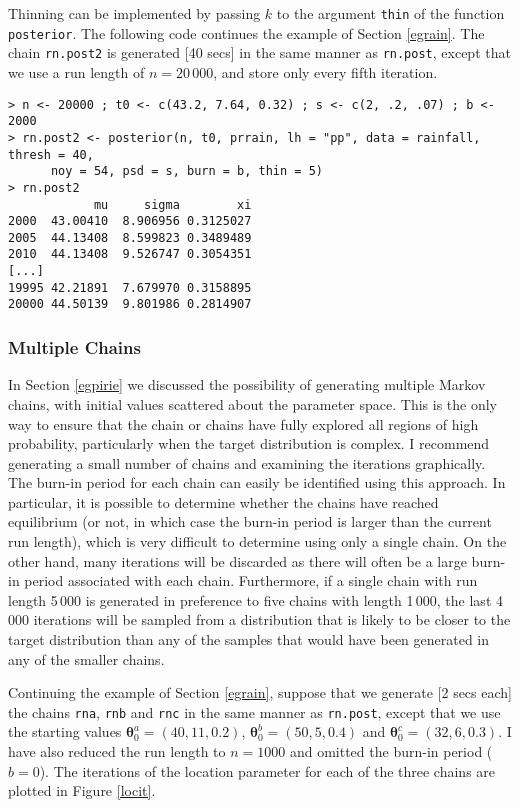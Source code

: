 \documentclass[11pt,a4paper]{article}
\newcommand{\bs}{\boldsymbol}
\begin{document}
Thinning can be implemented by passing $k$ to the argument \verb+thin+
of the function \verb+posterior+.  The following code continues the
example of Section \ref{egrain}.  The chain \verb+rn.post2+ is
generated [40 secs] in the same manner as \verb+rn.post+, except that
we use a run length of $n=20\,000$, and store only every fifth
iteration.

\begin{verbatim}
> n <- 20000 ; t0 <- c(43.2, 7.64, 0.32) ; s <- c(2, .2, .07) ; b <- 2000
> rn.post2 <- posterior(n, t0, prrain, lh = "pp", data = rainfall, thresh = 40, 
      noy = 54, psd = s, burn = b, thin = 5)
> rn.post2
            mu     sigma        xi
2000  43.00410  8.906956 0.3125027
2005  44.13408  8.599823 0.3489489
2010  44.13408  9.526747 0.3054351
[...]
19995 42.21891  7.679970 0.3158895
20000 44.50139  9.801986 0.2814907
\end{verbatim}

\subsubsection{Multiple Chains}
\label{multiple}

In Section \ref{egpirie} we discussed the possibility of generating
multiple Markov chains, with initial values scattered about the
parameter space.  This is the only way to ensure that the chain or
chains have fully explored all regions of high probability,
particularly when the target distribution is complex.  I recommend
generating a small number of chains and examining the iterations
graphically.  The burn-in period for each chain can easily be
identified using this approach.  In particular, it is possible to
determine whether the chains have reached equilibrium (or not, in
which case the burn-in period is larger than the current run length),
which is very difficult to determine using only a single chain.  On
the other hand, many iterations will be discarded as there will often
be a large burn-in period associated with each chain.  Furthermore, if
a single chain with run length 5\,000 is generated in preference to
five chains with length 1\,000, the last 4\,000 iterations will be
sampled from a distribution that is likely to be closer to the target
distribution than any of the samples that would have been generated in
any of the smaller chains.

Continuing the example of Section \ref{egrain}, suppose that we
generate [2 secs each] the chains \verb+rna+, \verb+rnb+ and
\verb+rnc+ in the same manner as \verb+rn.post+, except that we use
the starting values $\bs{\theta}_0^a=(40,11,0.2)$,
$\bs{\theta}_0^b=(50,5,0.4)$ and $\bs{\theta}_0^c=(32,6,0.3)$.  I have
also reduced the run length to $n=1000$ and omitted the burn-in period
($b=0$).  The iterations of the location parameter for each of the
three chains are plotted in Figure \ref{locit}.
\end{document}
